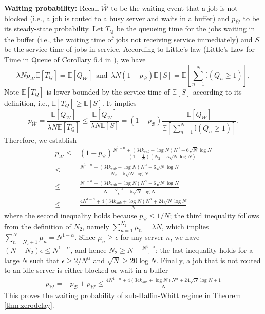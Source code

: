 \documentclass[11pt,oneside,letter]{article}
\begin{document}
\vspace{3 pt}
{\bf Waiting probability:} 
Recall $\overline{\mathcal W}$ to be the waiting event that a job is not blocked (i.e., a job is routed to a busy server and waits in a buffer) and  $p_{\overline{\mathcal W}}$ to be its steady-state probability. 
Let $T_{Q}$ be the queueing time for the jobs waiting in the buffer {(i.e., the waiting time of jobs not receiving service immediately) and $S$ be the service time of jobs in service}. {According to Little's law (Little’s Law for Time in Queue of Corollary 6.4 in \cite{harchol-balter_2013})}, we have $$\lambda N p_{\overline{\mathcal W}} \mathbb E[T_{Q}] = \mathbb E\left[Q_{\mathcal W}\right] ~~\text{and}~~ \lambda N(1-p_{\mathcal B})\mathbb E[S] = \mathbb E[\sum_{n=1}^N \mathbb I(Q_n \geq 1)],$$ 
Note $\mathbb E[T_{Q}]$ is lower bounded by the service time of $\mathbb E[S]$ according to its definition, i.e., $\mathbb E[T_{Q}] \geq \mathbb E[S]$. 
It implies $$p_{\overline{\mathcal W}} = \frac{\mathbb E\left[Q_{\mathcal W}\right]}{\lambda N \mathbb E[T_{Q}]} \leq \frac{\mathbb E\left[Q_{\mathcal W}\right]}{\lambda N \mathbb E[S]} = (1-p_{\mathcal B}) \frac{\mathbb E\left[Q_{\mathcal W}\right]}{\mathbb E[\sum_{n=1}^N \mathbb I(Q_n \geq 1)]}.$$  
Therefore, we establish
\begin{align*}
    p_{\overline{\mathcal W}} \leq& (1-p_{\mathcal B})\frac{N^{1-\alpha} +(34k_{sub} + \log N)N^\alpha + 6\sqrt{N}\log N}{(1-\frac{1}{N})(N_2 - 5\sqrt{N}\log N)} \\ 
     \leq& \frac{N^{1-\alpha} +(34k_{sub} + \log N)N^\alpha + 6\sqrt{N}\log N}{N_2 - 5\sqrt{N}\log N} \\
    \leq& \frac{N^{1-\alpha} +(34k_{sub} + \log N)N^\alpha + 6\sqrt{N}\log N}{N -\frac{N^{1-\alpha}}{\epsilon} - 5\sqrt{N}\log N}\\
    \leq& \frac{4N^{1-\alpha} +4(34k_{sub} + \log N)N^\alpha + 24\sqrt{N}\log N}{N}
\end{align*}
where the second inequality holds because $p_{\mathcal B} \leq 1/N$; 
{the third inequality follows from the definition of $N_2$, namely $\sum_{n=1}^{N_2}\mu_n = \lambda N$, which implies $\sum_{n=N_2+1}^{N}\mu_n = N^{1-\alpha}$. Since $\mu_n \ge \epsilon$ for any server $n$, we have $(N - N_2)\epsilon \le N^{1-\alpha}$, and hence $N_2 \ge N - \frac{N^{1-\alpha}}{\epsilon}$;}
the last inequality holds for a large $N$ such that $\epsilon \geq 2/N^\alpha$ and $\sqrt{N} \geq 20\log N.$ Finally, a job that is not routed to an idle server is either blocked or wait in a buffer
\begin{align*}
p_{\mathcal W} =&  p_{\mathcal B}+p_{\overline{\mathcal W}} \leq 
\frac{4N^{1-\alpha} + 4(34k_{sub} + \log N)N^\alpha + 24\sqrt{N}\log N + 1}{N}
\end{align*}
This proves the waiting probability of sub-Haffin-Whitt regime in Theorem \ref{thm:zerodelay}. 
\end{document}
